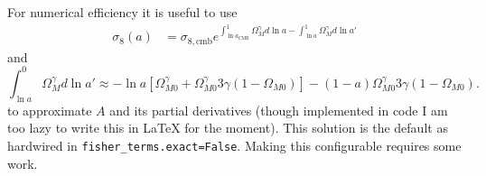 \documentclass{article}
\begin{document}
For numerical efficiency it is useful to use
\begin{align}
\sigma_8(a) & =\sigma_{8,\text{cmb}}  
 e^{\int^1_{\ln{a_\text{CMB}}} \Omega_M^\gamma d\ln{a} - \int_{\ln{a}}^1 \Omega_M^\gamma d\ln{a'} } 
\end{align}
and
\begin{equation}
\int_{\ln{a}}^0 \Omega_M^\gamma d\ln{a'} \approx -\ln{a} \left[\Omega_{M0}^\gamma + \Omega_{M0}^\gamma 3\gamma(1-\Omega_{M0} )\right] 
- (1-a) \Omega_{M0}^\gamma 3\gamma (1-\Omega_{M0}).
\end{equation}
to approximate $A$ and its partial derivatives (though implemented in code I am too lazy to write this in LaTeX for the moment).  This solution is the default as hardwired in {\tt fisher\_terms.exact=False}.  Making this configurable requires some work.
\end{document}
